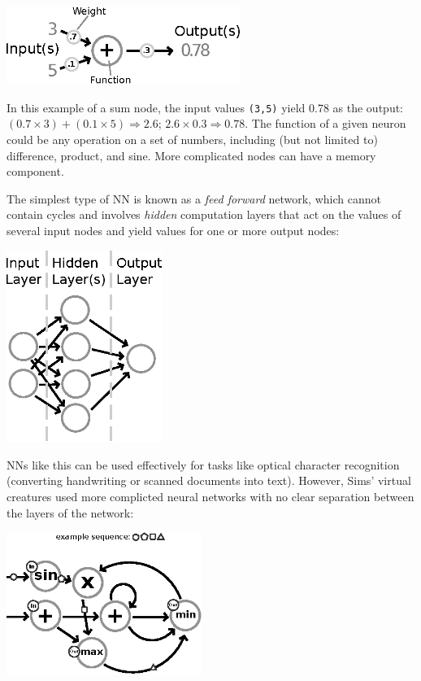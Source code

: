 \beforefig
\centerline{\includegraphics[width=3in]{./pycritters_figs/Neuron.eps}}
\afterfig

In this example of a sum node, the input values {\tt (3,5)} yield 0.78 as the output: 
$(0.7\times 3)+(0.1\times 5) \Rightarrow 2.6$; $2.6 \times 0.3 \Rightarrow 0.78$. 
The function of a given neuron could be any operation on a set of numbers, including 
(but not limited to) difference, product, and sine. More complicated nodes can 
have a memory component.

The simplest type of NN is known as a {\em feed forward} network, which cannot contain cycles and involves {\em hidden} computation layers that act on the values 
of several input nodes and yield values for one or more output nodes:

\beforefig
\centerline{\includegraphics[width=2in]{./pycritters_figs/NN.eps}}
\afterfig

NNs like this can be used effectively for tasks like optical character
recognition (converting handwriting or scanned documents into text). However,
Sims' virtual creatures used more complicted neural networks with no clear
separation between the layers of the network:

\beforefig
\centerline{\includegraphics[width=2.5in]{./pycritters_figs/ComplexNN.eps}}
\afterfig

